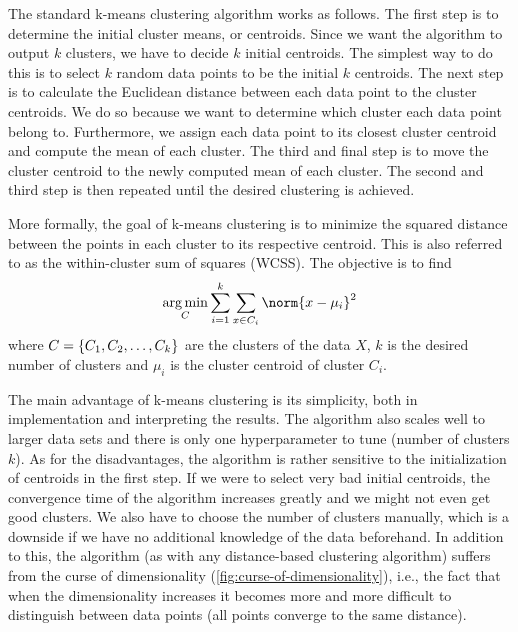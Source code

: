 The standard k-means clustering algorithm works as follows. The first step is to determine the initial cluster means, or centroids. Since we want the algorithm to output $k$ clusters, we have to decide $k$ initial centroids. The simplest way to do this is to select $k$ random data points to be the initial $k$ centroids. The next step is to calculate the Euclidean distance between each data point to the cluster centroids. We do so because we want to determine which cluster each data point belong to. Furthermore, we assign each data point to its closest cluster centroid and compute the mean of each cluster. The third and final step is to move the cluster centroid to the newly computed mean of each cluster. The second and third step is then repeated until the desired clustering is achieved.

More formally, the goal of k-means clustering is to minimize the squared distance between the points in each cluster to its respective centroid. This is also referred to as the within-cluster sum of squares (WCSS). The objective is to find
\begin{align}
    \argmin_{C} \sumlim{i=1}{k} \sumlim{x \in C_i}{} \norm{x - \mu_i}^2
\end{align}
where $C = \left\{C_1, C_2, \ldots, C_k\right\}$ are the clusters of the data $X$, $k$ is the desired number of clusters and $\mu_i$ is the cluster centroid of cluster $C_i$.

The main advantage of k-means clustering is its simplicity, both in implementation and interpreting the results. The algorithm also scales well to larger data sets and there is only one hyperparameter to tune (number of clusters $k$). As for the disadvantages, the algorithm is rather sensitive to the initialization of centroids in the first step. If we were to select very bad initial centroids, the convergence time of the algorithm increases greatly and we might not even get good clusters. We also have to choose the number of clusters manually, which is a downside if we have no additional knowledge of the data beforehand. In addition to this, the algorithm (as with any distance-based clustering algorithm) suffers from the curse of dimensionality (\cref{fig:curse-of-dimensionality}), i.e., the fact that when the dimensionality increases it becomes more and more difficult to distinguish between data points (all points converge to the same distance).

